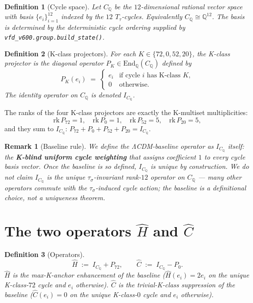 \documentclass[11pt]{article}
\newtheorem{definition}{Definition}[section]
\newtheorem{remark}{Remark}[section]
\newcommand{\CQ}{C_{\mathbb{Q}}}
\newcommand{\IC}{I_{\CQ}}
\newcommand{\PK}[1]{P_{#1}}
\newcommand{\Hop}{\hat H}
\newcommand{\Cop}{\hat C}
\begin{document}
\begin{definition}[Cycle space]\label{def:cyclespace}
Let $\CQ$ be the $12$-dimensional rational vector space with basis
$\{e_i\}_{i=1}^{12}$ indexed by the $12$ $T_\tau$-cycles. Equivalently
$\CQ \cong \mathbb{Q}^{12}$. The basis is determined by the
deterministic cycle ordering supplied by
\texttt{vfd\_v600.group.build\_state()}.
\end{definition}

\begin{definition}[K-class projectors]\label{def:Kproj}
For each $K \in \{72, 0, 52, 20\}$, the \emph{K-class projector} is
the diagonal operator $\PK{K} \in \mathrm{End}_{\mathbb{Q}}(\CQ)$
defined by
\[
  \PK{K}(e_i) \;=\; \begin{cases} e_i & \text{if cycle $i$ has K-class }K, \\
                                  0 & \text{otherwise}. \end{cases}
\]
The identity operator on $\CQ$ is denoted $\IC$.
\end{definition}

The ranks of the four K-class projectors are exactly the K-multiset
multiplicities:
\[
  \mathrm{rk}\,\PK{72} = 1, \quad
  \mathrm{rk}\,\PK{0}  = 1, \quad
  \mathrm{rk}\,\PK{52} = 5, \quad
  \mathrm{rk}\,\PK{20} = 5,
\]
and they sum to $\IC$:
$\PK{72} + \PK{0} + \PK{52} + \PK{20} = \IC$.

\begin{remark}[Baseline rule]\label{rem:baseline}
We define the \emph{ΛCDM-baseline operator} as $\IC$ itself: the
\textbf{K-blind uniform cycle weighting} that assigns coefficient $1$
to every cycle basis vector. Once the baseline is so defined, $\IC$
is unique by construction. We do not claim $\IC$ is the unique
$\tau_\sigma$-invariant rank-$12$ operator on $\CQ$ --- many other
operators commute with the $\tau_\sigma$-induced cycle action; the
baseline is a definitional choice, not a uniqueness theorem.
\end{remark}

\section{The two operators $\Hop$ and $\Cop$}\label{sec:operators}

\begin{definition}[Operators]\label{def:ops}
\[
  \Hop \;:=\; \IC + \PK{72}, \qquad \Cop \;:=\; \IC - \PK{0}.
\]
$\Hop$ is the \emph{max-K-anchor enhancement} of the baseline
($\Hop(e_i) = 2 e_i$ on the unique K-class-$72$ cycle and $e_i$
otherwise). $\Cop$ is the \emph{trivial-K-class suppression} of the
baseline ($\Cop(e_i) = 0$ on the unique K-class-$0$ cycle and $e_i$
otherwise).
\end{definition}
\end{document}
